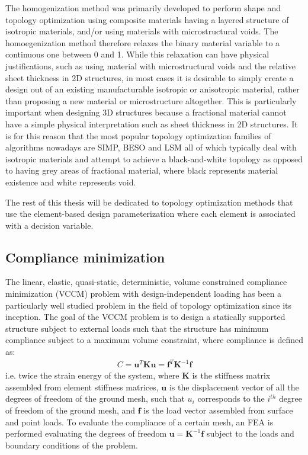 The homogenization method was primarily developed to perform shape and topology optimization using composite materials having a layered structure of isotropic materials, and/or using materials with microstructural voids. The homoegenization method therefore relaxes the binary material variable to a continuous one between 0 and 1. While this relaxation can have physical justifications, such as using material with microstructural voids and the relative sheet thickness in 2D structures, in most cases it is desirable to simply create a design out of an existing manufacturable isotropic or anisotropic material, rather than proposing a new material or microstructure altogether. This is particularly important when designing 3D structures because a fractional material cannot have a simple physical interpretation such as sheet thickness in 2D structures. It is for this reason that the most popular topology optimization families of algorithms nowadays are SIMP, BESO and LSM all of which typically deal with isotropic materials and attempt to achieve a black-and-white topology as opposed to having grey areas of fractional material, where black represents material existence and white represents void.

The rest of this thesis will be dedicated to topology optimization methods that use the element-based design parameterization where each element is associated with a decision variable.

\subsection{Compliance minimization}

The linear, elastic, quasi-static, deterministic, volume constrained compliance minimization (VCCM) problem with design-independent loading has been a particularly well studied problem in the field of topology optimization since its inception. The goal of the VCCM problem is to design a statically supported structure subject to external loads such that the structure has minimum compliance subject to a maximum volume constraint, where compliance is defined as:
\begin{align} \label{eqn:compliance}
  C = \bm{u}^T\bm{K}\bm{u} = \bm{f}^T\bm{K}^{-1}\bm{f}
\end{align}
i.e. twice the strain energy of the system, where $\bm{K}$ is the stiffness matrix assembled from element stiffness matrices, $\bm{u}$ is the displacement vector of all the degrees of freedom of the ground mesh, such that $u_i$ corresponds to the $i^{th}$ degree of freedom of the ground mesh, and $\bm{f}$ is the load vector assembled from surface and point loads. To evaluate the compliance of a certain mesh, an FEA is performed evaluating the degrees of freedom $\bm{u} = \bm{K}^{-1}\bm{f}$ subject to the loads and boundary conditions of the problem.

